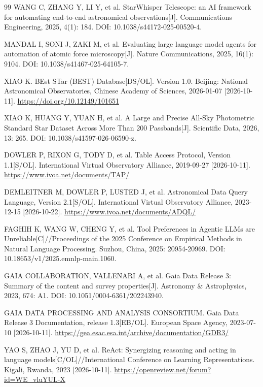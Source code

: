 \documentclass{dcfp}
\begin{document}
\begin{PaperBody}
\begin{thebibliography}{99}
 WANG C, ZHANG Y, LI Y, et al. StarWhisper Telescope: an AI framework for automating end-to-end astronomical observations[J]. Communications Engineering, 2025, 4(1): 184. DOI: 10.1038/s44172-025-00520-4.

 MANDAL I, SONI J, ZAKI M, et al. Evaluating large language model agents for automation of atomic force microscopy[J]. Nature Communications, 2025, 16(1): 9104. DOI: 10.1038/s41467-025-64105-7.

 XIAO K. BEst STar (BEST) Database[DS/OL]. Version 1.0. Beijing: National Astronomical Observatories, Chinese Academy of Sciences, 2026-01-07 [2026-10-11]. \url{https://doi.org/10.12149/101651}

 XIAO K, HUANG Y, YUAN H, et al. A Large and Precise All-Sky Photometric Standard Star Dataset Across More Than 200 Passbands[J]. Scientific Data, 2026, 13: 265. DOI: 10.1038/s41597-026-06590-z.

 DOWLER P, RIXON G, TODY D, et al. Table Access Protocol, Version 1.1[S/OL]. International Virtual Observatory Alliance, 2019-09-27 [2026-10-11]. \url{https://www.ivoa.net/documents/TAP/}

 DEMLEITNER M, DOWLER P, LUSTED J, et al. Astronomical Data Query Language, Version 2.1[S/OL]. International Virtual Observatory Alliance, 2023-12-15 [2026-10-22]. \url{https://www.ivoa.net/documents/ADQL/}

 FAGHIH K, WANG W, CHENG Y, et al. Tool Preferences in Agentic LLMs are Unreliable[C]//Proceedings of the 2025 Conference on Empirical Methods in Natural Language Processing. Suzhou, China, 2025: 20954-20969. DOI: 10.18653/v1/2025.emnlp-main.1060.

 GAIA COLLABORATION, VALLENARI A, et al. Gaia Data Release 3: Summary of the content and survey properties[J]. Astronomy \& Astrophysics, 2023, 674: A1. DOI: 10.1051/0004-6361/202243940.

 GAIA DATA PROCESSING AND ANALYSIS CONSORTIUM. Gaia Data Release 3 Documentation, release 1.3[EB/OL]. European Space Agency, 2023-07-10 [2026-10-11]. \url{https://gea.esac.esa.int/archive/documentation/GDR3/}

 YAO S, ZHAO J, YU D, et al. ReAct: Synergizing reasoning and acting in language models[C/OL]//International Conference on Learning Representations. Kigali, Rwanda, 2023 [2026-10-11]. \url{https://openreview.net/forum?id=WE_vluYUL-X}


\end{thebibliography}
\end{PaperBody}
\end{document}
